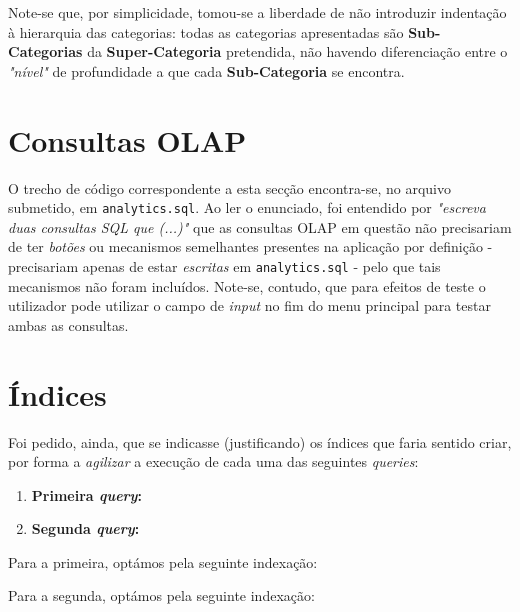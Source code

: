 \documentclass[12pt,a4paper]{article}
\begin{document}
\begin{enumerate}
    Note-se que, por simplicidade, tomou-se a liberdade de não introduzir indentação
    à hierarquia das categorias: todas as categorias apresentadas são
    \textbf{Sub-Categorias} da \textbf{Super-Categoria} pretendida, não havendo diferenciação
    entre o \textit{"nível"} de profundidade a que cada \textbf{Sub-Categoria} se encontra.

  \end{enumerate}


  \section*{Consultas OLAP}

  O trecho de código correspondente a esta secção encontra-se, no arquivo submetido,
  em \texttt{analytics.sql}. Ao ler o enunciado, foi entendido por \textit{"escreva
  duas consultas SQL que (...)"} que as consultas OLAP em questão não precisariam
  de ter \textit{botões} ou mecanismos semelhantes presentes na aplicação por
  definição - precisariam apenas de estar \textit{escritas} em \texttt{analytics.sql} -
  pelo que tais mecanismos não foram incluídos. Note-se, contudo, que para efeitos de teste
  o utilizador pode utilizar o campo de \textit{input} no fim do menu principal
  para testar ambas as consultas.

  \section*{Índices}

  Foi pedido, ainda, que se indicasse (justificando) os índices que faria sentido
  criar, por forma a \textit{agilizar} a execução de cada uma das seguintes \textit{queries}:

  \begin{enumerate}
    \item \textbf{Primeira \textit{query}:}
    
    

    \item \textbf{Segunda \textit{query}:}
  
    
  \end{enumerate}
  
  Para a primeira, optámos pela seguinte indexação:


  Para a segunda, optámos pela seguinte indexação:

\end{document}
